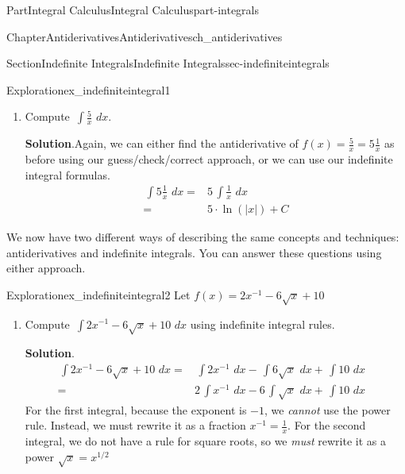 \documentclass{tufte-book}
\newcommand{\blocktitlefont}{\relax}
\numberwithin{equation}{chapter}
\newcommand{\intdx}[1]{{\,\int#1\,\,dx}}
\newcommand{\amp}{&}
\begin{document}
\begin{partptx}{Part}{Integral Calculus}{}{Integral Calculus}{}{}{part-integrals}
\begin{chapterptx}{Chapter}{Antiderivatives}{}{Antiderivatives}{}{}{ch_antiderivatives}
\begin{sectionptx}{Section}{Indefinite Integrals}{}{Indefinite Integrals}{}{}{sec-indefiniteintegrals}
\begin{exploration}{Exploration}{}{ex_indefiniteintegral1}
\begin{enumerate}[font=\bfseries,label=(\alph*),ref=\alph*]
\begin{align*}
\intdx{\frac{1}{\sqrt[3]{x}}} = \amp \intdx{ x^{-1/3}} 
\end{align*}
Because \(\frac{-1}{3}\neq -1\), we can use the indefinite integral formula \(\intdx{x^m} = \frac{1}{m+1}x^{m+1} + C\)%
\begin{align*}
\phantom{\intdx{ \frac{1}{ \sqrt[3]{x} }  }} = \amp \dfrac{1}{-1/3+1} x^{-1/3+1} \\
= \amp \dfrac{1}{2/3} x^{2/3} + C \\
= \amp \dfrac{1}{0.66\dots} x^{0.66\dots}
\end{align*}
%
\item{}Compute \(\intdx{\frac{5}{x}} \).%
\par\smallskip%
\noindent\textbf{\blocktitlefont Solution}.\hypertarget{ex_indefiniteintegral1-3-2}{}\quad{}Again, we can either find the antiderivative of \(f(x) = \frac{5}{x} = 5\frac{1}{x}\) as before using our guess\slash{}check\slash{}correct approach, or we can use our indefinite integral formulas.%
\begin{align*}
\intdx{5\frac{1}{x} } = \amp 5\intdx{\frac{1}{x}}\\
= \amp 5\cdot \ln(|x|) + C
\end{align*}
%
\end{enumerate}%
\end{exploration}%
We now have two different ways of describing the same concepts and techniques: antiderivatives and indefinite integrals. You can answer these questions using either approach.%
\begin{exploration}{Exploration}{}{ex_indefiniteintegral2}%
Let  \(f(x) = 2x^{-1} - 6\sqrt{x} + 10\)%
\begin{enumerate}[font=\bfseries,label=(\alph*),ref=\alph*]%
\item{}Compute \(\intdx{ 2x^{-1} - 6\sqrt{x} + 10 }\) using indefinite integral rules.%
\par\smallskip%
\noindent\textbf{\blocktitlefont Solution}.\hypertarget{ex_indefiniteintegral2-2-2}{}\quad{}%
\begin{align*}
\intdx{ 2x^{-1} - 6\sqrt{x} + 10 } = \amp \intdx{ 2x^{-1} } - \intdx{6\sqrt{x}} + \intdx{10} \amp \\
= \amp 2\intdx{x^{-1}} - 6\intdx{\sqrt{x}} + \intdx{10}  
\end{align*}
For the first integral, because the exponent is \(-1\), we \emph{cannot} use the power rule.  Instead, we must rewrite it as a fraction \(x^{-1}=\frac{1}{x}\). For the second integral, we do not have a rule for square roots, so we \emph{must} rewrite it as a power \(\sqrt{x} = x^{1/2}\)%

\end{enumerate}
\end{exploration}
\end{sectionptx}
\end{chapterptx}
\end{partptx}
\end{document}
